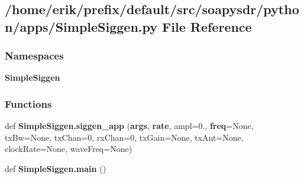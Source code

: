 \subsection{/home/erik/prefix/default/src/soapysdr/python/apps/\+Simple\+Siggen.py File Reference}
\label{SimpleSiggen_8py}
\subsubsection*{Namespaces}
\begin{DoxyCompactItemize}
\item 
 {\bf Simple\+Siggen}
\end{DoxyCompactItemize}
\subsubsection*{Functions}
\begin{DoxyCompactItemize}
\item 
def {\bf Simple\+Siggen.\+siggen\+\_\+app} ({\bf args}, {\bf rate}, ampl=0., {\bf freq}=None, tx\+Bw=None, tx\+Chan=0, rx\+Chan=0, tx\+Gain=None, tx\+Ant=None, clock\+Rate=None, wave\+Freq=None)
\item 
def {\bf Simple\+Siggen.\+main} ()
\end{DoxyCompactItemize}
